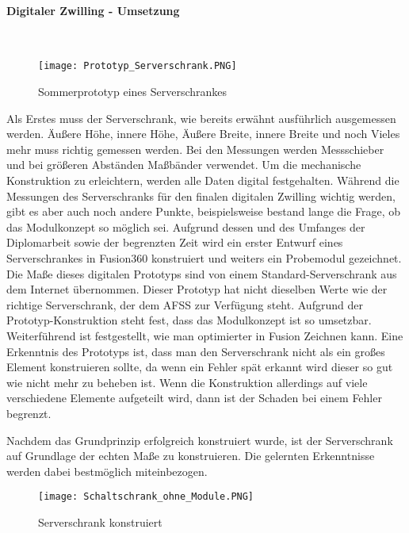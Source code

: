     \paragraph{Digitaler Zwilling - Umsetzung}\mbox{}\\ 

    \begin{figure}[h]
        \centering
        \texttt{[image: Prototyp\_Serverschrank.PNG]}
        \caption{Sommerprototyp eines Serverschrankes}
        \label{fig:Sommerprototyp}
    \end{figure}
    Als Erstes muss der Serverschrank, wie bereits erwähnt ausführlich ausgemessen werden. Äußere Höhe, innere Höhe, Äußere Breite, innere Breite und noch Vieles mehr muss richtig gemessen werden.    
    Bei den Messungen werden Messschieber und bei größeren Abständen Maßbänder verwendet. Um die mechanische Konstruktion zu erleichtern, werden alle Daten digital festgehalten.   
    Während die Messungen des Serverschranks für den finalen digitalen Zwilling wichtig werden, gibt es aber auch noch andere Punkte, beispielsweise bestand lange die Frage, ob das Modulkonzept so möglich sei. Aufgrund dessen und des Umfanges der Diplomarbeit sowie der begrenzten Zeit wird ein erster Entwurf eines Serverschrankes in Fusion360 konstruiert und weiters ein Probemodul gezeichnet. Die Maße dieses digitalen Prototyps sind von einem Standard-Serverschrank aus dem Internet übernommen.
    Dieser Prototyp hat nicht dieselben Werte wie der richtige Serverschrank, der dem AFSS zur Verfügung steht. Aufgrund der Prototyp-Konstruktion steht fest, dass das Modulkonzept ist so umsetzbar. Weiterführend ist festgestellt, wie man optimierter in Fusion Zeichnen kann.
    Eine Erkenntnis des Prototyps ist, dass man den Serverschrank nicht als ein großes Element konstruieren sollte, da wenn ein Fehler spät erkannt wird dieser so gut wie nicht mehr zu beheben ist. Wenn die Konstruktion allerdings auf viele verschiedene Elemente aufgeteilt wird, dann ist der Schaden bei einem Fehler begrenzt. 

    Nachdem das Grundprinzip erfolgreich konstruiert wurde, ist der Serverschrank auf Grundlage der echten Maße zu konstruieren. Die gelernten Erkenntnisse werden dabei bestmöglich miteinbezogen.\\    
    \begin{figure}[h]
        \centering
        \texttt{[image: Schaltschrank\_ohne\_Module.PNG]} 
        \caption{Serverschrank konstruiert}
        \label{fig:Clean_Serverschrank}
    \end{figure}

